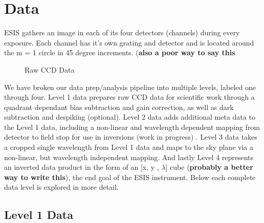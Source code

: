 	
\section{Data} \label{sec:data}
    ESIS gathers an image in each of its four detectors (channels) during every exposure.  
    Each channel has it's own grating and detector and is located around the m = 1 circle in 45 degree increments. (\textbf{also a poor way to say this}
    
    \begin{figure}
        \centering
        \caption{Raw CCD Data}
        \label{fig:Level0}
    \end{figure}
    
    We have broken our data prep/analysis pipeline into multiple levels, labeled one through four.
    Level 1 data prepares raw CCD data for scientific work through a quadrant dependant bias subtraction and gain correction, as well as dark subtraction and despiking (optional).
    Level 2 data adds additional meta data to the Level 1 data, including a non-linear and wavelength dependent mapping from detector to field stop for use in inversions (work in progress)  .
    Level 3 data takes a cropped single wavelength from Level 1 data and maps to the sky plane via a non-linear, but wavelength independent mapping.
    And lastly Level 4 represents an inverted data product in the form of an [x, y , $\lambda$] cube (\textbf{probably a better way to write this}), the end goal of the ESIS instrument.
    Below each complete data level is explored in more detail.
    
    \subsection{Level 1 Data}
    

    
    	

